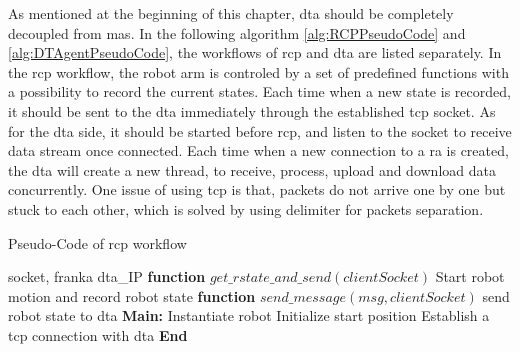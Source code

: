 As mentioned at the beginning of this chapter, \gls{dta} should be completely decoupled from \gls{mas}. 
In the following algorithm \ref{alg:RCPPseudoCode} and \ref{alg:DTAgentPseudoCode}, the workflows of \gls{rcp} and \gls{dta} are listed separately.
In the \gls{rcp} workflow, the robot arm is controled by a set of predefined functions with a possibility to record the current states. 
Each time when a new state is recorded, it should be sent to the \gls{dta} immediately through the established \gls{tcp} socket.
As for the \gls{dta} side, it should be started before \gls{rcp}, and listen to the socket to receive data stream once connected.
Each time when a new connection to a \gls{ra} is created, the \gls{dta} will create a new thread, to receive, process, upload and download data concurrently.
One issue of using \gls{tcp} is that, packets do not arrive one by one but stuck to each other, which is solved by using delimiter for packets separation.  



\begin{breakablealgorithm}
    \caption{Pseudo-Code of \gls{rcp} workflow}
    \label{alg:RCPPseudoCode}
    \begin{algorithmic}
     socket, franka
     \gls{dta}\_IP
    \State \textbf{function} {$get\_rstate\_and\_send(clientSocket)$}
        \State \qquad Start robot motion and record robot state
        \State {}
    \State \textbf{function} {$send\_message(msg, clientSocket)$}
        \State \qquad send robot state to \gls{dta} 
    \State \textbf{Main:}
    \State \qquad Instantiate robot
    \State \qquad Initialize start position
    \State \qquad Establish a \gls{tcp} connection with \gls{dta}  
    \State {}
    \State \textbf{End}
    \end{algorithmic}
\end{breakablealgorithm}


